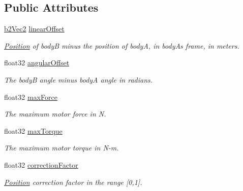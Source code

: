 \subsection*{Public Attributes}
\begin{DoxyCompactItemize}
\item 
\mbox{\label{structb2MotorJointDef_a2c957cffc2af66c6c8077c069b906bc4}} 
\hyperlink{structb2Vec2}{b2\+Vec2} \hyperlink{structb2MotorJointDef_a2c957cffc2af66c6c8077c069b906bc4}{linear\+Offset}
\begin{DoxyCompactList}\small\item\em \hyperlink{structPosition}{Position} of bodyB minus the position of bodyA, in bodyA\textquotesingle{}s frame, in meters. \end{DoxyCompactList}\item 
\mbox{\label{structb2MotorJointDef_abdb42eff4aeff1d48038e084c57e1cb0}} 
float32 \hyperlink{structb2MotorJointDef_abdb42eff4aeff1d48038e084c57e1cb0}{angular\+Offset}
\begin{DoxyCompactList}\small\item\em The bodyB angle minus bodyA angle in radians. \end{DoxyCompactList}\item 
\mbox{\label{structb2MotorJointDef_a2f66d1b99c654e112dc68e15375d5ee7}} 
float32 \hyperlink{structb2MotorJointDef_a2f66d1b99c654e112dc68e15375d5ee7}{max\+Force}
\begin{DoxyCompactList}\small\item\em The maximum motor force in N. \end{DoxyCompactList}\item 
\mbox{\label{structb2MotorJointDef_afcf5dd58166917a4574d1f28f6bb3660}} 
float32 \hyperlink{structb2MotorJointDef_afcf5dd58166917a4574d1f28f6bb3660}{max\+Torque}
\begin{DoxyCompactList}\small\item\em The maximum motor torque in N-\/m. \end{DoxyCompactList}\item 
\mbox{\label{structb2MotorJointDef_ab282afdb92d07ead23530f57fd0eb9ea}} 
float32 \hyperlink{structb2MotorJointDef_ab282afdb92d07ead23530f57fd0eb9ea}{correction\+Factor}
\begin{DoxyCompactList}\small\item\em \hyperlink{structPosition}{Position} correction factor in the range \mbox{[}0,1\mbox{]}. \end{DoxyCompactList}\end{DoxyCompactItemize}


